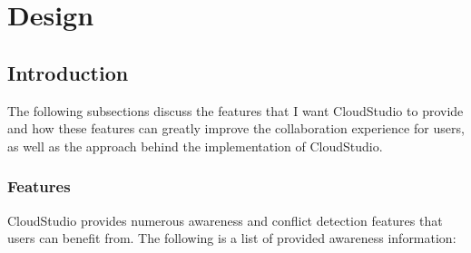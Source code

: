 

\chapter{Design}\label{design}


\section{Introduction}


The following subsections discuss the features that I want CloudStudio to provide and how these features can greatly improve the collaboration experience for users, as well as the approach behind the implementation of CloudStudio.


\subsection{Features}\label{designfeatures}

CloudStudio provides numerous awareness and conflict detection features that users can benefit from. The following is a list of provided awareness information:



